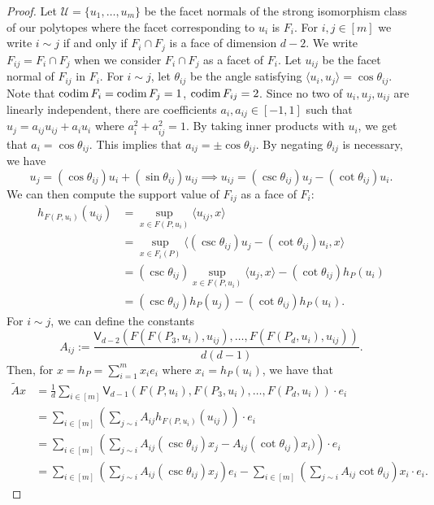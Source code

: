 \documentclass{puthesis-UG}
\begin{document}
\begin{proof}
	Let $\mathcal{U} = \{u_1, \ldots, u_m\}$ be the facet normals of the strong isomorphism class of our polytopes where the facet corresponding to $u_i$ is $F_i$. For $i, j \in [m]$ we write $i \sim j$ if and only if $F_i \cap F_j$ is a face of dimension $d-2$. We write $F_{ij} = F_i \cap F_j$ when we consider $F_i \cap F_j$ as a facet of $F_i$. Let $u_{ij}$ be the facet normal of $F_{ij}$ in $F_i$. For $i \sim j$, let $\theta_{ij}$ be the angle satisfying $\langle u_i, u_j \rangle = \cos \theta_{ij}$. Note that $\operatorname{codim} F_i = \operatorname{codim} F_j = 1$, $\operatorname{codim} F_{ij} = 2$. Since no two of $u_i, u_j, u_{ij}$ are linearly independent, there are coefficients $a_i, a_{ij} \in [-1, 1]$ such that $u_j = a_{ij} u_{ij} + a_i u_i$ where $a_i^2 + a_{ij}^2 = 1$. By taking inner products with $u_i$, we get that $a_i = \cos \theta_{ij}$. This implies that $a_{ij} = \pm \cos \theta_{ij}$. By negating $\theta_{ij}$ is necessary, we have 
	\[
		u_j = (\cos \theta_{ij}) u_i + (\sin \theta_{ij}) u_{ij} \implies u_{ij} = (\csc \theta_{ij}) u_j - (\cot \theta_{ij}) u_i.
	\]
	We can then compute the support value of $F_{ij}$ as a face of $F_i$:
	\begin{align*}
		h_{F(P, u_i)} (u_{ij}) & = \sup_{x \in F(P, u_i)} \langle u_{ij}, x \rangle \\
		& = \sup_{x \in F_i(P)} \langle (\csc \theta_{ij}) u_j - (\cot \theta_{ij}) u_i, x \rangle \\
		& = (\csc \theta_{ij}) \sup_{x \in F(P, u_i)} \langle u_j, x \rangle - (\cot \theta_{ij}) h_P(u_i) \\
		& = (\csc \theta_{ij}) h_P(u_j) - (\cot \theta_{ij}) h_P(u_i).
	\end{align*}
	For $i \sim j$, we can define the constants
	\[
		A_{ij} := \frac{\mathsf{V}_{d-2}(F(F(P_3, u_i), u_{ij}), \ldots, F(F(P_d, u_i), u_{ij}))}{d(d-1)}.
	\]
	Then, for $x = h_P = \sum_{i = 1}^m x_i e_i$ where $x_i = h_P(u_i)$, we have that 
	\begin{align*}
		\widetilde{A} x & = \frac{1}{d} \sum_{i \in [m]} \mathsf{V}_{d-1} (F(P, u_i), F(P_3, u_i), \ldots, F(P_d, u_i)) \cdot e_i \\
		& = \sum_{i \in [m]}  \left ( \sum_{j \sim i} A_{ij} h_{F(P, u_i)}(u_{ij}) \right ) \cdot e_i \\
		& = \sum_{i \in [m]} \left (  \sum_{j \sim i} A_{ij} (\csc \theta_{ij}) x_j - A_{ij} (\cot \theta_{ij}) x_i) \right ) \cdot e_i \\
		& = \sum_{i \in [m]} \left ( \sum_{j \sim i} A_{ij} (\csc \theta_{ij}) x_j \right ) e_i - \sum_{i \in [m]} \left ( \sum_{j \sim i} A_{ij} \cot \theta_{ij} \right ) x_i \cdot e_i.

\end{align*}
\end{proof}
\end{document}
